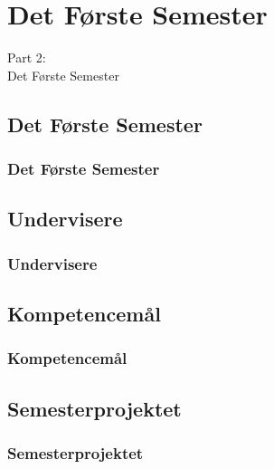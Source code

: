 \documentclass[t, aspectratio=169]{beamer}
\begin{document}
\section{Det Første Semester}
\begin{frame}
  \vspace{25mm}
  \begin{center}
    \Huge{Part 2:\\Det Første Semester}
  \end{center}
\end{frame}

\subsection{Det Første Semester}
\begin{frame}[fragile]
  \frametitle{Det Første Semester}
  \vspace{1mm}
  
\end{frame}

\subsection{Undervisere}
\begin{frame}[fragile]
  \frametitle{Undervisere}
  \vspace{1mm}
  
\end{frame}

\subsection{Kompetencemål}
\begin{frame}[fragile]
  \frametitle{Kompetencemål}
  \vspace{1mm}
  
\end{frame}


\subsection{Semesterprojektet}
\begin{frame}[fragile]
  \frametitle{Semesterprojektet}
  \vspace{1mm}
  
\end{frame}
\end{document}
